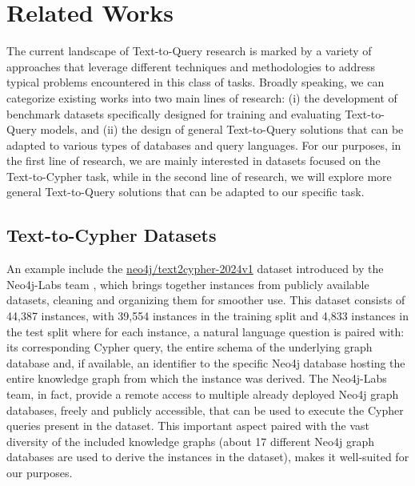 \section{Related Works}

The current landscape of Text-to-Query research is marked by a variety of approaches that leverage different techniques and methodologies to address typical problems encountered in this class of tasks. Broadly speaking, we can categorize existing works into two main lines of research: (i) the development of benchmark datasets specifically designed for training and evaluating Text-to-Query models, and (ii) the design of general Text-to-Query solutions that can be adapted to various types of databases and query languages. For our purposes, in the first line of research, we are mainly interested in datasets focused on the Text-to-Cypher task, while in the second line of research, we will explore more general Text-to-Query solutions that can be adapted to our specific task.

\subsection{Text-to-Cypher Datasets} 

An example include the \href{https://huggingface.co/datasets/neo4j/text2cypher-2024v1}{neo4j/text2cypher-2024v1} dataset introduced by the Neo4j-Labs team \cite{neo4jlabs-text2cypher-2024}, which brings together instances from publicly available datasets, cleaning and organizing them for smoother use. This dataset consists of 44,387 instances, with 39,554 instances in the training split and 4,833 instances in the test split where for each instance, a natural language question is paired with: its corresponding Cypher query, the entire schema of the underlying graph database and, if available, an identifier to the specific Neo4j database hosting the entire knowledge graph from which the instance was derived. The Neo4j-Labs team, in fact, provide a remote access to multiple already deployed Neo4j graph databases, freely and publicly accessible, that can be used to execute the Cypher queries present in the dataset. This important aspect paired with the vast diversity of the included knowledge graphs (about 17 different Neo4j graph databases are used to derive the instances in the dataset), makes it well-suited for our purposes.


